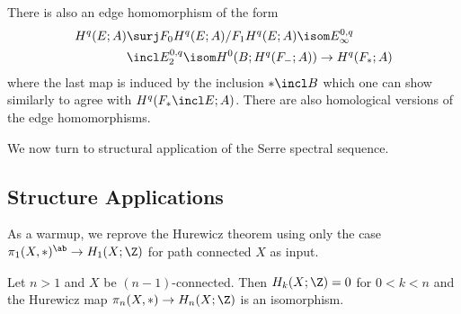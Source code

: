 There is also an edge homomorphism of the form
\begin{align*}
	H^q(E; A) &\surj F_0 H^q(E; A) / F_1 H^q(E; A) \isom E_\infty^{0, q} \\
			  &\incl E_2^{0, q} \isom H^0(B; H^q(F_{-}; A)) \to H^q(F_*; A)
\end{align*}
where the last map is induced by the inclusion $* \incl B$ which one can show similarly to agree with $H^q(F_* \incl E; A)$.
There are also homological versions of the edge homomorphisms.

We now turn to structural application of the Serre spectral sequence.

\subsection{Structure Applications}
As a warmup, we reprove the Hurewicz theorem using only the case $\pi_1(X, *)^\ab \to H_1(X; \Z)$ for path connected $X$ as input.
\begin{proposition}[Hurewicz]\label{thm:hurewicz}
	Let $n > 1$ and $X$ be $(n - 1)$-connected.
	Then $H_k(X; \Z) = 0$ for $0 < k < n$ and the Hurewicz map $\pi_n(X, *) \to H_n(X; \Z)$ is an isomorphism.
\end{proposition}
